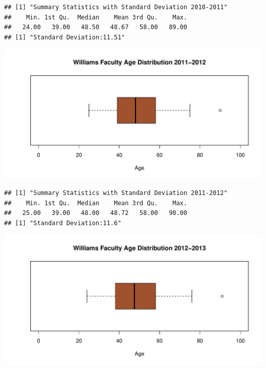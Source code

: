 \documentclass[12pt,a4paper]{article}\usepackage[]{graphicx}\usepackage[]{color}
\makeatletter
\def\maxwidth{ %
  \ifdim\Gin@nat@width>\linewidth
    \linewidth
  \else
    \Gin@nat@width
  \fi
}
\newenvironment{kframe}{%
 \def\at@end@of@kframe{}%
 \ifinner\ifhmode%
  \def\at@end@of@kframe{\end{minipage}}%
  \begin{minipage}{\columnwidth}%
 \fi\fi%
 \def\FrameCommand##1{\hskip\@totalleftmargin \hskip-\fboxsep
 \colorbox{shadecolor}{##1}\hskip-\fboxsep
     \hskip-\linewidth \hskip-\@totalleftmargin \hskip\columnwidth}%
 \MakeFramed {\advance\hsize-\width
   \@totalleftmargin\z@ \linewidth\hsize
   \@setminipage}}%
 {\par\unskip\endMakeFramed%
 \at@end@of@kframe}
\newenvironment{knitrout}{}{} %
\theoremstyle{definition}
\makeatother
\begin{document}
\begin{knitrout}
\color{fgcolor}\begin{kframe}
\begin{verbatim}
## [1] "Summary Statistics with Standard Deviation 2010-2011"
##    Min. 1st Qu.  Median    Mean 3rd Qu.    Max. 
##   24.00   39.00   48.50   48.67   58.00   89.00
## [1] "Standard Deviation:11.51"
\end{verbatim}
\end{kframe}
\end{knitrout}

\begin{knitrout}
\color{fgcolor}
\includegraphics[width=\maxwidth]{figure/unnamed-chunk-27-1} 

\end{knitrout}

\begin{knitrout}
\color{fgcolor}\begin{kframe}
\begin{verbatim}
## [1] "Summary Statistics with Standard Deviation 2011-2012"
##    Min. 1st Qu.  Median    Mean 3rd Qu.    Max. 
##   25.00   39.00   48.00   48.72   58.00   90.00
## [1] "Standard Deviation:11.6"
\end{verbatim}
\end{kframe}
\end{knitrout}



\begin{knitrout}
\color{fgcolor}
\includegraphics[width=\maxwidth]{figure/unnamed-chunk-29-1} 

\end{knitrout}
\end{document}

